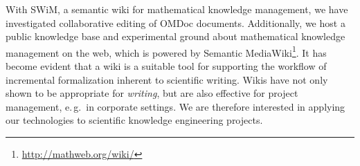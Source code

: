With SWiM, a semantic wiki for mathematical knowledge
management\cite{Lange:swmkm-tr07}, we have investigated collaborative editing of
OMDoc documents.  Additionally, we host a public knowledge base and experimental
ground about mathematical knowledge management on the web, which is powered by
Semantic MediaWiki\footnote{\url{http://mathweb.org/wiki/}}.  It has become
evident that a wiki is a suitable tool for supporting the workflow of
incremental formalization inherent to scientific writing.  Wikis have not only
shown to be appropriate for \emph{writing}, but are also effective for project
management, e.\,g.\ in corporate settings\cite{leuf01:wikiway,wikinomics}.  We
are therefore interested in applying our technologies to scientific knowledge
engineering projects.

